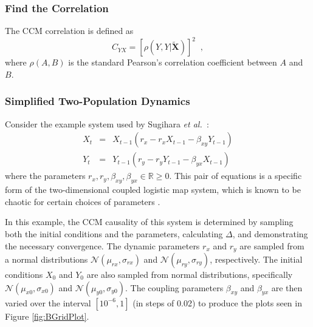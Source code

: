 \documentclass[twocolumn,aps,pre,groupedaddress]{revtex4-1}
\begin{document}
\subsubsection{Find the Correlation}
The CCM correlation is defined as 
$$
C_{YX} = \left[\rho\left(Y,Y|\tilde{\mathbf{X}}\right)\right]^2\;\;,
$$
where $\rho\left(A,B\right)$ is the standard Pearson's correlation coefficient between $A$ and $B$.  

\subsubsection{Simplified Two-Population Dynamics}
\label{sec:2Pop}
Consider the example system used by Sugihara {\em et al.\ }\cite{Sugihara2012}:
\begin{eqnarray}
\label{eqn:2pop}
X_t &=& X_{t-1}\left(r_x-r_x X_{t-1}-\beta_{xy} Y_{t-1}\right)\\
Y_t &=& Y_{t-1}\left(r_y-r_y Y_{t-1}-\beta_{yx} X_{t-1}\right)
\end{eqnarray}
where the parameters $r_x,r_y,\beta_{xy},\beta_{yx}\in\mathbb{R}\ge 0$.  This pair of equations is a specific form of the two-dimensional coupled logistic map system, which is known to be chaotic for certain choices of parameters \cite{Lloyd1995}.

In this example, the CCM causality of this system is determined by sampling both the initial conditions and the parameters, calculating $\Delta$, and demonstrating the necessary convergence.  The dynamic parameters $r_x$ and $r_y$ are sampled from a normal distributions $\mathcal{N}\left(\mu_{rx},\sigma_{rx}\right)$ and $\mathcal{N}\left(\mu_{ry},\sigma_{ry}\right)$, respectively.  The initial conditions $X_0$ and $Y_0$ are also sampled from normal distributions, specifically $\mathcal{N}\left(\mu_{x0},\sigma_{x0}\right)$ and $\mathcal{N}\left(\mu_{y0},\sigma_{y0}\right)$.  The coupling parameters $\beta_{xy}$ and $\beta_{yx}$ are then varied over the interval $[10^{-6},1]$ (in steps of 0.02) to produce the plots seen in Figure \ref{fig:BGridPlot}.
\end{document}
